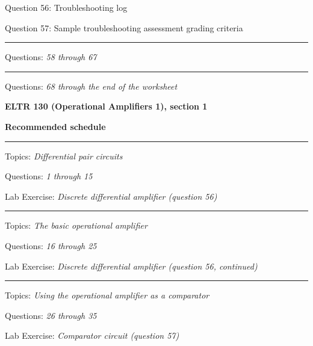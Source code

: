 \hskip 10pt Question 56: Troubleshooting log
 
\hskip 10pt Question 57: Sample troubleshooting assessment grading criteria
 
\vskip 10pt
\hrule \vskip 5pt
\noindent
{}

\hskip 10pt Questions: {\it 58 through 67}
 
\vskip 10pt
\hrule \vskip 5pt
\noindent
{}

\hskip 10pt Questions: {\it 68 through the end of the worksheet}
 
\vskip 10pt





\vfil \eject

\centerline{\bf ELTR 130 (Operational Amplifiers 1), section 1} \bigskip 
 
\vskip 10pt

\noindent
{\bf Recommended schedule}

\vskip 5pt

\hrule \vskip 5pt
\noindent
{}

\hskip 10pt Topics: {\it Differential pair circuits}
 
\hskip 10pt Questions: {\it 1 through 15}
 
\hskip 10pt Lab Exercise: {\it Discrete differential amplifier (question 56)}
 


\vskip 10pt
\hrule \vskip 5pt
\noindent
{}

\hskip 10pt Topics: {\it The basic operational amplifier}
 
\hskip 10pt Questions: {\it 16 through 25}
 
\hskip 10pt Lab Exercise: {\it Discrete differential amplifier (question 56, continued)}
 
\vskip 10pt
\hrule \vskip 5pt
\noindent
{}

\hskip 10pt Topics: {\it Using the operational amplifier as a comparator}
 
\hskip 10pt Questions: {\it 26 through 35}
 
\hskip 10pt Lab Exercise: {\it Comparator circuit (question 57)}
 
